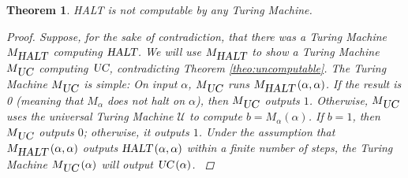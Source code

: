 \documentclass{book}
\newcommand{\fun}[2]{\ensuremath{#1\left(#2\right)}}
\newcommand{\slHALT}{\mbox{\sl HALT}}
\newcommand{\slUC}{\mbox{\sl UC}}
\newtheorem{theo}{Theorem}
\begin{document}
\begin{theo}
{\slHALT} is not computable by any Turing Machine.
\begin{proof}
Suppose, for the sake of contradiction, that there was a Turing Machine $M_{\slHALT}$ computing $\slHALT$. We will use $M_{\slHALT}$ to show a Turing Machine $M_{\slUC}$ computing $\slUC$, contradicting Theorem \ref{theo:uncomputable}. The Turing Machine $M_{\slUC}$ is simple: On input $\alpha$, $M_{\slUC}$ runs $\fun{M_{\slHALT}}{\alpha,\alpha}$. If the result is 0 (meaning that $M_\alpha$ does not halt on $\alpha$), then $M_{\slUC}$ outputs $1$. Otherwise, $M_{\slUC}$ uses the universal Turing Machine $\mathcal{U}$ to compute $b=\fun{M_{\alpha}}{\alpha}$. If $b=1$, then $M_{\slUC}$ outputs $0$; otherwise, it outputs $1$. Under the assumption that $\fun{M_{\slHALT}}{\alpha,\alpha}$ outputs $\fun{\slHALT}{\alpha,\alpha}$ within a finite number of steps, the Turing Machine $\fun{M_{\slUC}}{\alpha}$ will output $\fun{\slUC}{\alpha}$.
\cite{arora2009computational}
\end{proof}
\end{theo}
\end{document}
